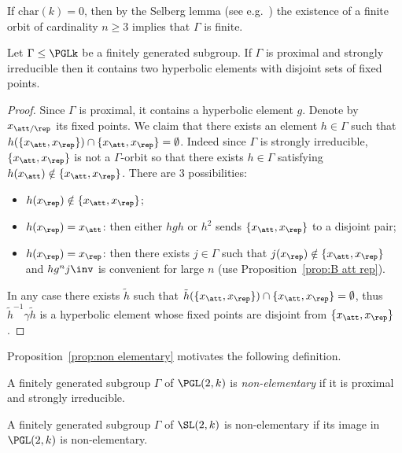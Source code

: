 \begin{rema}
If $\mathrm{char}(k) = 0$, then by the Selberg lemma (see e.g.~\cite{alperin}) the existence of a finite orbit of cardinality $n\geq 3$ implies that $\Gamma$ is finite.
\end{rema}



\begin{prop}\label{prop:non elementary}
Let $\Gamma\leq \PGLk$ be a finitely generated subgroup. If $\Gamma$ is proximal and strongly irreducible then it contains two hyperbolic elements with disjoint sets of fixed points.
\end{prop}

\begin{proof}
Since $\Gamma$ is proximal, it contains a hyperbolic element $g$. Denote by $x_{\att/\rep}$ its fixed points. We claim that there exists an element $h \in \Gamma$ such that $h(\{ x_\att, x_\rep\}) \cap\{ x_\att, x_\rep\}= \emptyset$. Indeed since $\Gamma$ is strongly irreducible, $\{ x_\att, x_\rep\}$ is not a $\Gamma$-orbit so that there exists $h\in \Gamma$ satisfying $h(x_\att) \notin \{ x_\att, x_\rep\}$. There are 3 possibilities:
\begin{itemize}
\item $h(x_\rep)\notin \{ x_\att, x_\rep\}$;
\item $h(x_\rep) = x_\att$: then either $hgh$ or $h^2$ sends $\{ x_\att, x_\rep\}$ to a disjoint pair;
\item $h(x_\rep) = x_\rep$: then there exists $j\in \Gamma$ such that $j(x_\rep)\notin \{ x_\att, x_\rep\}$ and $hg^nj\inv$ is convenient for large $n$ (use Proposition~\ref{prop:B att rep}).
\end{itemize}
In any case there exists $\tilde{h}$ such that $\tilde{h}(\{ x_\att, x_\rep\})\cap \{ x_\att, x_\rep\}=\emptyset$, thus $\tilde{h}^{- 1} \gamma \tilde{h}$ is a hyperbolic element whose fixed points are disjoint from $\{ x_\att, x_\rep\}$.
\end{proof}

Proposition~\ref{prop:non elementary} motivates the following definition.

\begin{defi}
A finitely generated subgroup $\Gamma$ of $\PGL(2,k)$ is \emph{non-elemen\-tary} if it is proximal and strongly irreducible.

A finitely generated subgroup $\Gamma$ of $\SL(2,k)$ is non-elementary if its image in $\PGL(2,k)$ is non-elementary.
\end{defi}

